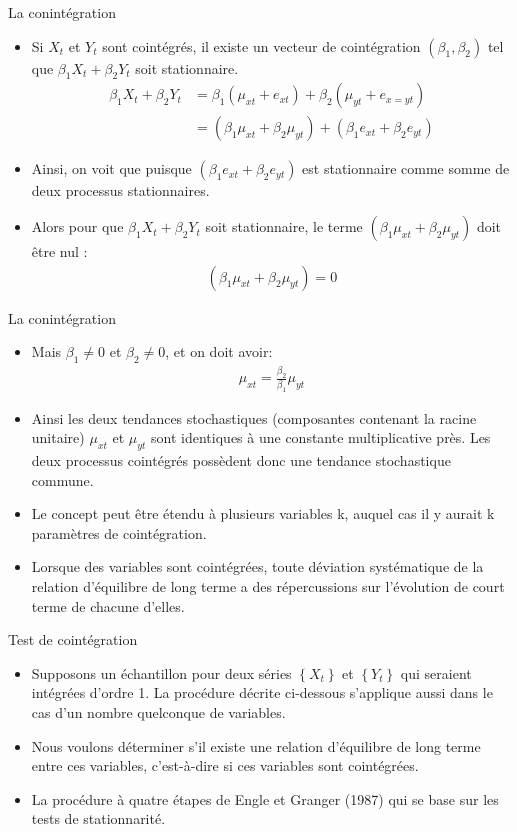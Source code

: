 \documentclass{beamer}
\begin{document}
\begin{frame}{La conintégration}
\begin{itemize}
\item Si $X_t$ et $Y_t$ sont cointégrés, il existe un vecteur de cointégration $(\beta_1, \beta_2)$ tel que $\beta_1X_t + \beta_2Y_t$ soit stationnaire.
\begin{align*}
\beta_1 X_t+\beta_2 Y_t & =\beta_1(\mu_{xt}+e_{xt})+\beta_2(\mu_{yt}+e_{x=yt})\\
& = (\beta_1\mu_{xt}+\beta_2 \mu_{yt})+(\beta_1e_{xt}+\beta_2 e_{yt})
\end{align*}
\item Ainsi, on voit que puisque $(\beta_1e_{xt}+\beta_2 e_{yt})$ est stationnaire comme somme de deux processus stationnaires.
\item Alors pour que $\beta_1 X_t+\beta_2 Y_t$ soit stationnaire, le terme $(\beta_1\mu_{xt}+\beta_2 \mu_{yt})$ doit être nul :
\begin{align*}
(\beta_1\mu_{xt}+\beta_2 \mu_{yt})=0
\end{align*}
\end{itemize}
\end{frame}



\begin{frame}{La conintégration}
\begin{itemize}
\item Mais $\beta_1 \neq 0$ et $\beta_2 \neq 0$, et on doit avoir:
\begin{align*}
\mu_{xt}=\frac{\beta_2}{\beta_1} \mu_{yt}
\end{align*}
\item Ainsi les deux tendances stochastiques (composantes contenant la racine unitaire) $\mu_{xt}$ et $\mu_{yt}$ sont identiques à une constante multiplicative près. Les deux processus cointégrés possèdent donc une tendance stochastique commune.
\item Le concept peut être étendu à plusieurs variables k, auquel cas il y aurait k paramètres de cointégration. 
\item Lorsque des variables sont cointégrées, toute déviation systématique de la relation d’équilibre de long terme a des répercussions sur l’évolution de court terme de chacune d’elles.  
\end{itemize}
\end{frame}

\begin{frame}{Test de cointégration}
\begin{itemize}
\item Supposons un échantillon pour deux séries $\left\{ X_t \right\}$ et $\left\{ Y_t \right\}$ qui seraient intégrées d’ordre 1. La procédure décrite ci-dessous s’applique aussi dans le cas d’un nombre quelconque de variables.
\item Nous voulons déterminer s’il existe une relation d’équilibre de long terme entre ces variables, c’est-à-dire si ces variables sont cointégrées.
\item La procédure à quatre étapes de Engle et Granger (1987) qui se base sur les tests de stationnarité.
\end{itemize}
\end{frame}
\end{document}
